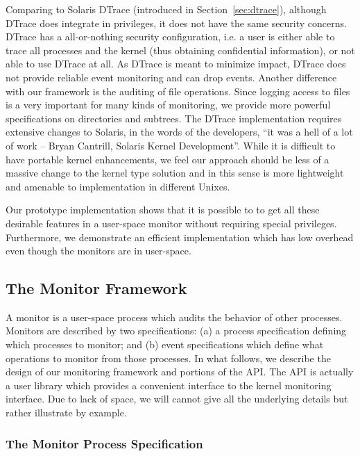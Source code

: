 Comparing to Solaris DTrace (introduced in Section~\ref{sec:dtrace}),
although DTrace does integrate in privileges,
it does not have the same security concerns.
DTrace has a all-or-nothing security configuration, i.e.
a user is either able to trace all processes and the kernel
(thus obtaining confidential information), or not able to use DTrace at all.
As DTrace is meant to minimize impact, DTrace does not provide
reliable event monitoring and can drop events.
Another difference with our framework is the auditing of file operations.
Since logging access to files is a very important for many kinds of monitoring,
we provide more powerful specifications on directories and subtrees.
The DTrace implementation requires extensive changes to Solaris,
in the words of the developers,
``it was a hell of a lot of work -- Bryan Cantrill, Solaris
Kernel Development''.
While it is difficult to have portable kernel enhancements, we feel our
approach should be less of a massive change to the kernel type solution and in
this sense is more lightweight and amenable to implementation
in different Unixes.

Our prototype implementation shows that it is possible to to get all
these desirable features in a user-space monitor without requiring special
privileges. Furthermore, we demonstrate an efficient implementation
which has low overhead even though the monitors are in user-space.


\subsection{The Monitor Framework}
\label{sec:framework}

A monitor is a user-space process which audits the behavior of other processes.
Monitors are described by two specifications:
(a) a process specification defining which processes to monitor; and
(b) event specifications which define what operations to monitor from
those processes.
In what follows, we describe the design of our monitoring framework and
portions of the API. The API is actually a user library which provides
a convenient interface to the kernel monitoring interface.
Due to lack of space, we will cannot give all the underlying
details but rather illustrate by example.

\subsubsection{The Monitor Process Specification}

